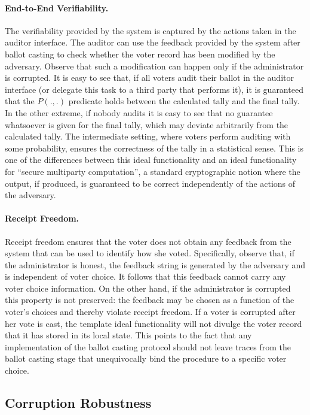 \paragraph{End-to-End Verifiability.} The verifiability provided by
the system is captured by the actions taken in the auditor
interface. The auditor can use the feedback provided by the system
after ballot casting to check whether the voter record has been
modified by the adversary. Observe that such a modification can happen
only if the administrator is corrupted. It is easy to see that, if all
voters audit their ballot in the auditor interface (or delegate this
task to a third party that performs it), it is guaranteed that the
$P(.,.)$ predicate holds between the calculated tally and the final
tally. In the other extreme, if nobody audits it is easy to see that
no guarantee whatsoever is given for the final tally, which may
deviate arbitrarily from the calculated tally. The intermediate
setting, where voters perform auditing with some probability, ensures
the correctness of the tally in a statistical sense. This is one of
the differences between this ideal functionality and an ideal
functionality for ``secure multiparty computation'', a standard
cryptographic notion where the output, if produced, is guaranteed to
be correct independently of the actions of the adversary.

\paragraph{Receipt Freedom.} Receipt freedom ensures that the voter
does not obtain any feedback from the system that can be used to
identify how she voted. Specifically, observe that, if the
administrator is honest, the feedback string is generated by the
adversary and is independent of voter choice. It follows that this
feedback cannot carry any voter choice information. On the other hand,
if the administrator is corrupted this property is not preserved: the
feedback may be chosen as a function of the voter's choices and
thereby violate receipt freedom. If a voter is corrupted after her
vote is cast, the template ideal functionality will not divulge the
voter record that it has stored in its local state. This points to the
fact that any implementation of the ballot casting protocol should not
leave traces from the ballot casting stage that unequivocally bind the
procedure to a specific voter choice.

\subsection{Corruption Robustness}

